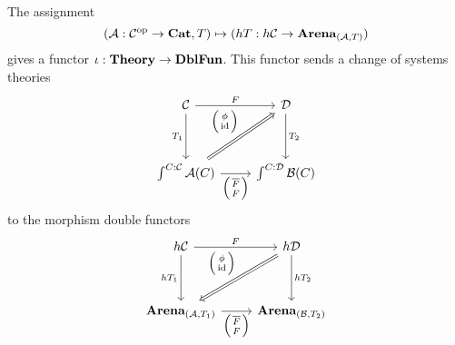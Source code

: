 \documentclass[DynamicalBook]{subfiles}
\begin{document}
\begin{lemma}
The assignment 
\[
(\mathcal{A} : \mathcal{C}^{\textnormal{op}} \to \textbf{Cat}, T) \mapsto (hT : h\mathcal{C} \to
\textbf{Arena}_{(\mathcal{A}, T)})
\]
gives a functor $\iota : \textbf{Theory} \to \textbf{DblFun}$. This functor sends a
change of systems theories
\begin{equation}\label{eqn.change_of_doctrines}
  \begin{tikzcd}[row sep = huge]
    \cat{C} \ar[r, "F"]\ar[d, "T_1"'] & \cat{D} \ar[d, "T_2"] \\
    \int^{C : \cat{C}}\cat{A}(C)\ar[r, "{\lens{\overline{F}}{F}}"']
    \ar[ur, Rightarrow, "{\littlelens{\phi}{\id}}"] &\int^{C : \cat{D}}\cat{B}(C)
  \end{tikzcd}
\end{equation}
to the morphism double functors
\begin{equation}\label{eqn.change_of_doctrines_dblfun}
  \begin{tikzcd}[row sep = huge]
    h\cat{C} \ar[r, "F"]\ar[d, "hT_1"'] & h\cat{D} \ar[d, "hT_2"]\ar[dl, Rightarrow, "{\littlelens{\phi}{\id}}"'] \\
    \Cat{Arena}_{(\cat{A}, T_1)}\ar[r, "{\lens{\overline{F}}{F}}"']
     & \Cat{Arena}_{(\cat{B}, T_2)}
  \end{tikzcd}
\end{equation}
\end{lemma}
\end{document}
